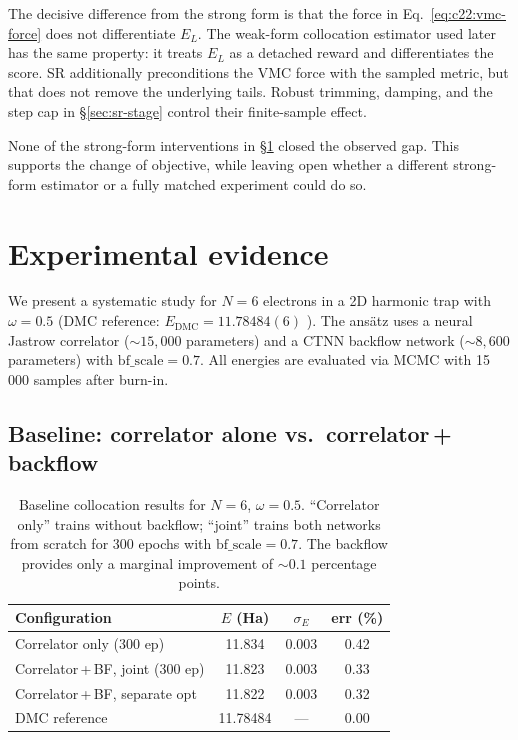 The decisive difference from the strong form is that the force in
Eq.~\eqref{eq:c22:vmc-force} does not differentiate $E_L$. The weak-form collocation
estimator used later has the same property: it treats $E_L$ as a detached reward and
differentiates the score. SR additionally preconditions the VMC force with the sampled
metric, but that does not remove the underlying tails. Robust trimming, damping, and the
step cap in \S\ref{sec:sr-stage} control their finite-sample effect.

None of the strong-form interventions in \S\ref{app:catch22:experiments} closed the
observed gap. This supports the change of objective, while leaving open whether a different
strong-form estimator or a fully matched experiment could do so.


\section{Experimental evidence}
\label{app:catch22:experiments}

We present a systematic study for $N{=}6$ electrons in a 2D harmonic trap
with $\omega{=}0.5$ (DMC reference: $E_{\mathrm{DMC}}=11.78484(6)$
\cite{Hogberget2013-DMC,Nordhagen2023-NeuralNetworksFermions}).
The ans\"atz uses a neural Jastrow correlator (${\sim}15{,}000$ parameters)
and a CTNN backflow network (${\sim}8{,}600$ parameters) with
$\mathrm{bf\_scale}=0.7$.
All energies are evaluated via MCMC with 15\,000 samples after
burn-in.

\subsection{Baseline: correlator alone vs.\ correlator\,+\,backflow}
\label{app:catch22:baseline}

\begin{table}[htbp]
\centering
\caption[Baseline strong-form collocation results]{Baseline collocation results for $N{=}6$, $\omega{=}0.5$.
``Correlator only'' trains without backflow; ``joint'' trains both
networks from scratch for 300 epochs with $\mathrm{bf\_scale}=0.7$.
The backflow provides only a marginal improvement of ${\sim}0.1$ percentage
points.}
\label{tab:c22:baseline}
\begin{tabular}{l c c c}
\toprule
Configuration & $E$ (Ha) & $\sigma_E$ & err (\%) \\
\midrule
Correlator only (300 ep) & 11.834 & 0.003 & 0.42 \\
Correlator\,+\,BF, joint (300 ep) & 11.823 & 0.003 & 0.33 \\
Correlator\,+\,BF, separate opt & 11.822 & 0.003 & 0.32 \\
\midrule
DMC reference & 11.78484 & --- & 0.00 \\
\bottomrule
\end{tabular}
\end{table}

